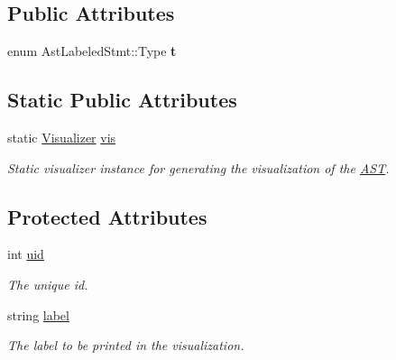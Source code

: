 \subsection*{Public Attributes}
\begin{DoxyCompactItemize}
\item 
\hypertarget{classAstLabeledStmt_a1b1d9e2134b11333de074dcf01d4f7e6}{enum Ast\-Labeled\-Stmt\-::\-Type {\bfseries t}}\label{classAstLabeledStmt_a1b1d9e2134b11333de074dcf01d4f7e6}

\end{DoxyCompactItemize}
\subsection*{Static Public Attributes}
\begin{DoxyCompactItemize}
\item 
\hypertarget{classAST_aca9e6637209b31e03a09c0d42f29bdfa}{static \hyperlink{classVisualizer}{Visualizer} \hyperlink{classAST_aca9e6637209b31e03a09c0d42f29bdfa}{vis}}\label{classAST_aca9e6637209b31e03a09c0d42f29bdfa}

\begin{DoxyCompactList}\small\item\em Static visualizer instance for generating the visualization of the \hyperlink{classAST}{A\-S\-T}. \end{DoxyCompactList}\end{DoxyCompactItemize}
\subsection*{Protected Attributes}
\begin{DoxyCompactItemize}
\item 
\hypertarget{classAST_a847b778f1c3dd5a19de32de432ee6e15}{int \hyperlink{classAST_a847b778f1c3dd5a19de32de432ee6e15}{uid}}\label{classAST_a847b778f1c3dd5a19de32de432ee6e15}

\begin{DoxyCompactList}\small\item\em The unique id. \end{DoxyCompactList}\item 
\hypertarget{classAST_ab2e239ccc0688d2341724432ff5a1a31}{string \hyperlink{classAST_ab2e239ccc0688d2341724432ff5a1a31}{label}}\label{classAST_ab2e239ccc0688d2341724432ff5a1a31}

\begin{DoxyCompactList}\small\item\em The label to be printed in the visualization. \end{DoxyCompactList}\end{DoxyCompactItemize}
